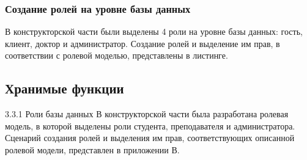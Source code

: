 \subsubsection{Создание ролей на уровне базы данных}


В конструкторской части были выделены 4 роли на уровне базы данных: гость, клиент, доктор и администратор. Создание ролей и выделение им прав, в соответствии с ролевой моделью, представлены в листинге. 

\subsection{Хранимые функции}
3.3.1 Роли базы данных
В конструкторской части была разработана ролевая модель, в которой
выделены роли студента, преподавателя и администратора. Сценарий создания ролей и выделения им прав, соответствующих описанной ролевой модели,
представлен в приложении В.